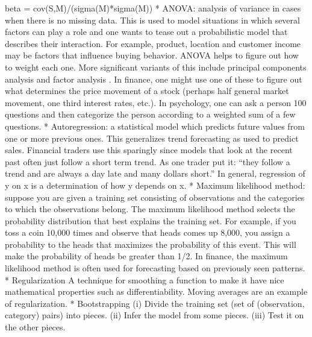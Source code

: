       beta = cov(S,M)/(sigma(M)*sigma(M))
    * ANOVA: analysis of variance in cases when there is no missing data. This is used to model situations in which several factors can play a role and one wants to tease out a probabilistic model that describes their interaction. For example, product, location and customer income may be factors that influence buying behavior. ANOVA helps to figure out how to weight each one. More significant variants of this include principal components analysis and factor analysis . In finance, one might use one of these to figure out what determines the price movement of a stock (perhaps half general market movement, one third interest rates, etc.). In psychology, one can ask a person 100 questions and then categorize the person according to a weighted sum of a few questions.
    * Autoregression: a statistical model which predicts future values from one or more previous ones. This generalizes trend forecasting as used to predict sales. Financial traders use this sparingly since models that look at the recent past often just follow a short term trend. As one trader put it: ``they follow a trend and are always a day late and many dollars short.'' In general, regression of y on x is a determination of how y depends on x.
    * Maximum likelihood method: suppose you are given a training set consisting of observations and the categories to which the observations belong. The maximum likelihood method selects the probability distribution that best explains the training set. For example, if you toss a coin 10,000 times and observe that heads comes up 8,000, you assign a probability to the heads that maximizes the probability of this event. This will make the probability of heads be greater than 1/2. In finance, the maximum likelihood method is often used for forecasting based on previously seen patterns.
    * Regularization A technique for smoothing a function to make it have nice mathematical properties such as differentiability. Moving averages are an example of regularization.
    * Bootstrapping (i) Divide the training set (set of (observation, category) pairs) into pieces. (ii) Infer the model from some pieces. (iii) Test it on the other pieces. 